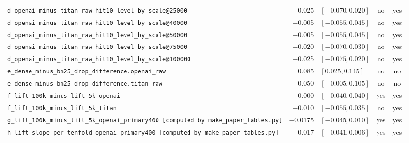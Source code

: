 \begin{table}[t]
{\begin{tabular}{lrlcc}
\texttt{d\_openai\_minus\_titan\_raw\_hit10\_level\_by\_scale@25000} & $-$0.025 & $[-0.070, 0.020]$ & no & yes \\
\texttt{d\_openai\_minus\_titan\_raw\_hit10\_level\_by\_scale@40000} & $-$0.005 & $[-0.055, 0.045]$ & no & yes \\
\texttt{d\_openai\_minus\_titan\_raw\_hit10\_level\_by\_scale@50000} & $-$0.005 & $[-0.055, 0.045]$ & no & yes \\
\texttt{d\_openai\_minus\_titan\_raw\_hit10\_level\_by\_scale@75000} & $-$0.020 & $[-0.070, 0.030]$ & no & yes \\
\texttt{d\_openai\_minus\_titan\_raw\_hit10\_level\_by\_scale@100000} & $-$0.025 & $[-0.075, 0.020]$ & no & yes \\
\texttt{e\_dense\_minus\_bm25\_drop\_difference.openai\_raw} & 0.085 & $[0.025, 0.145]$ & no & no \\
\texttt{e\_dense\_minus\_bm25\_drop\_difference.titan\_raw} & 0.050 & $[-0.005, 0.105]$ & no & no \\
\texttt{f\_lift\_100k\_minus\_lift\_5k\_openai} & 0.000 & $[-0.040, 0.040]$ & yes & yes \\
\texttt{f\_lift\_100k\_minus\_lift\_5k\_titan} & $-$0.010 & $[-0.055, 0.035]$ & no & yes \\
\texttt{g\_lift\_100k\_minus\_lift\_5k\_openai\_primary400 [computed by make\_paper\_tables.py]} & $-$0.0175 & $[-0.045, 0.010]$ & yes & yes \\
\texttt{h\_lift\_slope\_per\_tenfold\_openai\_primary400 [computed by make\_paper\_tables.py]} & $-$0.017 & $[-0.041, 0.006]$ & yes & yes \\
\bottomrule
\end{tabular}}
\end{table}
